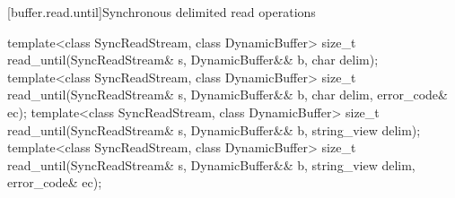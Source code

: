 [buffer.read.until]{Synchronous delimited read operations}

%
\begin{itemdecl}
template<class SyncReadStream, class DynamicBuffer>
  size_t read_until(SyncReadStream& s, DynamicBuffer&& b, char delim);
template<class SyncReadStream, class DynamicBuffer>
  size_t read_until(SyncReadStream& s, DynamicBuffer&& b,
                    char delim, error_code& ec);
template<class SyncReadStream, class DynamicBuffer>
  size_t read_until(SyncReadStream& s, DynamicBuffer&& b, string_view delim);
template<class SyncReadStream, class DynamicBuffer>
  size_t read_until(SyncReadStream& s, DynamicBuffer&& b,
                    string_view delim, error_code& ec);
\end{itemdecl}

